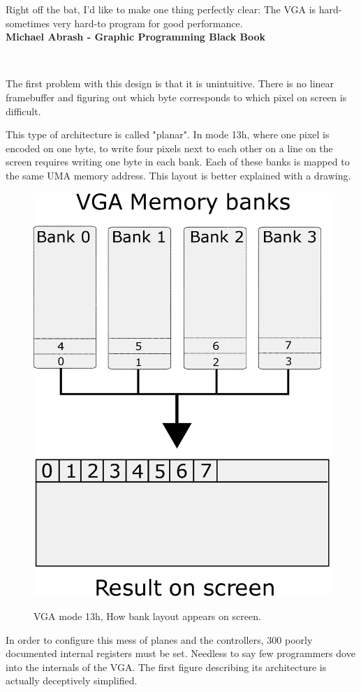 \documentclass[book.tex]{subfiles}
\begin{document}
 \begin{fancyquotes}
   Right off the bat, I'd like to make one thing perfectly clear: The VGA is hard-sometimes very hard-to program for good performance.
 \bigskip \\
\textbf{Michael Abrash - Graphic Programming Black Book}
 \end{fancyquotes}
 \\
\par
The first problem with this design is that it is unintuitive. There is no linear framebuffer and figuring out which byte corresponds to which pixel on screen is difficult.\\
\par
 This type of architecture is called "planar". In mode 13h, where one pixel is encoded on one byte, to write four pixels next to each other on a line on the screen requires writing one byte in each bank. Each of these banks is mapped to the same UMA memory address. This layout is better explained with a drawing.\\
\par
\begin{figure}[H]
\centering
\includegraphics[width=.5\textwidth]{imgs/drawings/vga_ram_screen_layout.eps}
\label{fig:vga_arch}
\caption{VGA mode 13h, How bank layout appears on screen.}
\end{figure}

 

\par
In order to configure this mess of planes and the controllers, 300 poorly documented internal registers must be set. Needless to say few programmers dove into the internals of the VGA. The first figure describing its architecture is actually deceptively simplified.\pagebreak
\end{document}
